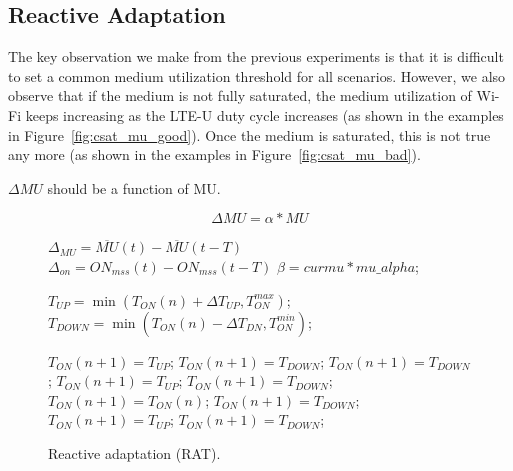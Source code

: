 \subsection{Reactive Adaptation}

The key observation we make from the previous experiments is that it is difficult to set a common medium utilization threshold for all scenarios. However, we also observe that if the medium is not fully saturated, the medium utilization of Wi-Fi keeps increasing as the LTE-U duty cycle increases (as shown in the examples in Figure~\ref{fig:csat_mu_good}). Once the medium is saturated, this is not true any more (as shown in the examples in Figure~\ref{fig:csat_mu_bad}). 

$\Delta{MU}$ should be a function of MU.

\begin{equation}
\Delta{MU}=\alpha * MU
\end{equation}



\begin{figure}[tbp]
\centering
\begin{minipage}{.45\textwidth}
  \centering
\begin{algorithmic}[1]
 {\small

        \State $\Delta_{MU} = \overline{MU}(t) - \overline{MU}(t-T)$
        \State $\Delta_{on} = {ON}_{mss}(t) - {ON}_{mss}(t-T)$
        \State $\beta = curmu * mu\_alpha$;
 
        \State $T_{UP} = \min ( T_{ON}(n) + \Delta T_{UP}, T^{max}_{ON})$;
        \State $T_{DOWN} = \min ( T_{ON}(n) - \Delta T_{DN}, T^{min}_{ON})$;

                    \label{rat:ups}
            \State $T_{ON}(n+1) = T_{UP}$;
             \label{rat:upd}
            \State $T_{ON}(n+1) = T_{DOWN}$;
          \Else
            \State $T_{ON}(n+1) = T_{DOWN}$;
          \EndIf                           \label{rat:upe}
                  \label{rat:eqs}
            \State $T_{ON}(n+1) = T_{UP}$;
              \label{rat:eqd}
            \State $T_{ON}(n+1) = T_{DOWN}$;
          \Else
            \State $T_{ON}(n+1) = T_{ON}(n)$;
          \EndIf                            \label{rat:eqe}
       \Else                                \label{rat:dns}
            \State $T_{ON}(n+1) = T_{DOWN}$;
            \State $T_{ON}(n+1) = T_{UP}$;
          \Else
            \State $T_{ON}(n+1) = T_{DOWN}$;
          \EndIf                            \label{rat:dne}
       \EndIf
	
	
\EndFunction
}
\end{algorithmic}
\end{minipage}
\caption{{Reactive adaptation (RAT).}} 
\label{fig:rat}
\vspace{-6pt}
\end{figure}

